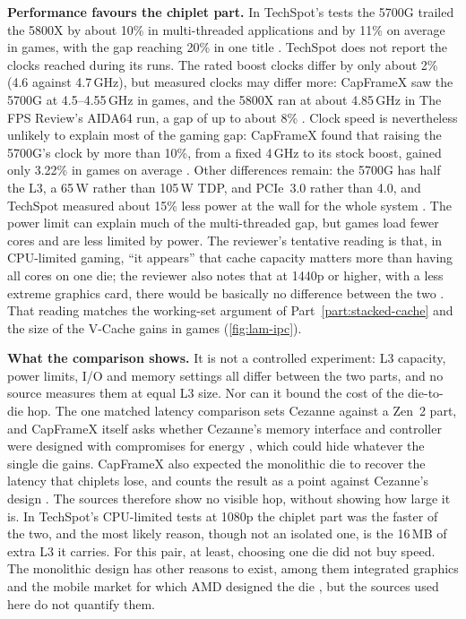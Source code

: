 \textbf{Performance favours the chiplet part.} In TechSpot's tests the 5700G trailed the 5800X by about 10\% in multi-threaded applications and by 11\% on average in games, with the gap reaching 20\% in one title \cite{waltonAMDRyzen72021}. TechSpot does not report the clocks reached during its runs. The rated boost clocks differ by only about 2\% (4.6 against 4.7\,GHz), but measured clocks may differ more: CapFrameX saw the 5700G at 4.5--4.55\,GHz in games, and the 5800X ran at about 4.85\,GHz in The FPS Review's AIDA64 run, a gap of up to about 8\% \cite{devtechprofileWhomCezanneCould2021,justiceAMDRyzen72021}. Clock speed is nevertheless unlikely to explain most of the gaming gap: CapFrameX found that raising the 5700G's clock by more than 10\%, from a fixed 4\,GHz to its stock boost, gained only 3.22\% in games on average \cite{devtechprofileWhomCezanneCould2021}. Other differences remain: the 5700G has half the L3, a 65\,W rather than 105\,W TDP, and PCIe~3.0 rather than 4.0, and TechSpot measured about 15\% less power at the wall for the whole system \cite{waltonAMDRyzen72021}. The power limit can explain much of the multi-threaded gap, but games load fewer cores and are less limited by power. The reviewer's tentative reading is that, in CPU-limited gaming, ``it appears'' that cache capacity matters more than having all cores on one die; the reviewer also notes that at 1440p or higher, with a less extreme graphics card, there would be basically no difference between the two \cite{waltonAMDRyzen72021}. That reading matches the working-set argument of Part~\ref{part:stacked-cache} and the size of the V-Cache gains in games (\cref{fig:lam-ipc}).

\textbf{What the comparison shows.} It is not a controlled experiment: L3 capacity, power limits, I/O and memory settings all differ between the two parts, and no source measures them at equal L3 size. Nor can it bound the cost of the die-to-die hop. The one matched latency comparison sets Cezanne against a Zen~2 part, and CapFrameX itself asks whether Cezanne's memory interface and controller were designed with compromises for energy \cite{devtechprofileWhomCezanneCould2021}, which could hide whatever the single die gains. CapFrameX also expected the monolithic die to recover the latency that chiplets lose, and counts the result as a point against Cezanne's design \cite{devtechprofileWhomCezanneCould2021}. The sources therefore show no visible hop, without showing how large it is. In TechSpot's CPU-limited tests at 1080p the chiplet part was the faster of the two, and the most likely reason, though not an isolated one, is the 16\,MB of extra L3 it carries. For this pair, at least, choosing one die did not buy speed. The monolithic design has other reasons to exist, among them integrated graphics and the mobile market for which AMD designed the die \cite{waltonAMDRyzen72021}, but the sources used here do not quantify them.


